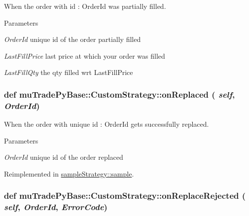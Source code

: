 When the order with id : OrderId was partially filled. 
\begin{DoxyParams}{Parameters}
\item[{\em OrderId}]unique id of the order partially filled \item[{\em LastFillPrice}]last price at which your order was filled \item[{\em LastFillQty}]the qty filled wrt LastFillPrice \end{DoxyParams}
\hypertarget{classmuTradePyBase_1_1CustomStrategy_a85a80a9afefdf345a46c520fad9b5138}{
\subsubsection[{onReplaced}]{\setlength{\rightskip}{0pt plus 5cm}def muTradePyBase::CustomStrategy::onReplaced ( {\em self}, \/   {\em OrderId})}}
\label{classmuTradePyBase_1_1CustomStrategy_a85a80a9afefdf345a46c520fad9b5138}


When the order with unique id : OrderId gets successfully replaced. 
\begin{DoxyParams}{Parameters}
\item[{\em OrderId}]unique id of the order replaced \end{DoxyParams}


Reimplemented in \hyperlink{classsampleStrategy_1_1sample_a796c72e272e1fa82e689b587cf7f7ab5}{sampleStrategy::sample}.\hypertarget{classmuTradePyBase_1_1CustomStrategy_a2e18cb62689e42982bc46836f5fa156b}{
\subsubsection[{onReplaceRejected}]{\setlength{\rightskip}{0pt plus 5cm}def muTradePyBase::CustomStrategy::onReplaceRejected ( {\em self}, \/   {\em OrderId}, \/   {\em ErrorCode})}}
\label{classmuTradePyBase_1_1CustomStrategy_a2e18cb62689e42982bc46836f5fa156b}


